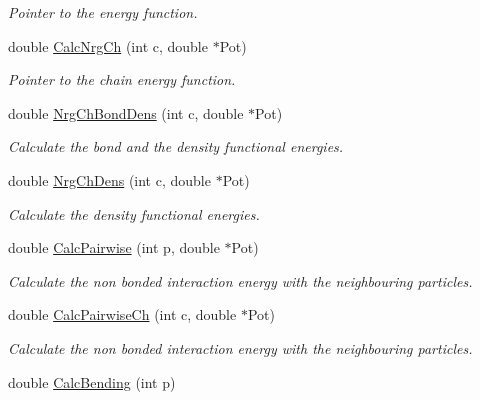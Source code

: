 \begin{DoxyCompactItemize}
\begin{DoxyCompactList}\small\item\em \-Pointer to the energy function. \end{DoxyCompactList}\item 
\hypertarget{classForces_ac028948e0862f18bf805f23078ebf7fa}{double \hyperlink{classForces_ac028948e0862f18bf805f23078ebf7fa}{\-Calc\-Nrg\-Ch} (int c, double $\ast$\-Pot)}\label{classForces_ac028948e0862f18bf805f23078ebf7fa}

\begin{DoxyCompactList}\small\item\em \-Pointer to the chain energy function. \end{DoxyCompactList}\item 
double \hyperlink{classForces_ab282af6b6987c94833eb3eb9bc5d28a4}{\-Nrg\-Ch\-Bond\-Dens} (int c, double $\ast$\-Pot)
\begin{DoxyCompactList}\small\item\em \-Calculate the bond and the density functional energies. \end{DoxyCompactList}\item 
\hypertarget{classForces_ab40568d4784987cff90e5081eee86a93}{double \hyperlink{classForces_ab40568d4784987cff90e5081eee86a93}{\-Nrg\-Ch\-Dens} (int c, double $\ast$\-Pot)}\label{classForces_ab40568d4784987cff90e5081eee86a93}

\begin{DoxyCompactList}\small\item\em \-Calculate the density functional energies. \end{DoxyCompactList}\item 
\hypertarget{classForces_abcf9fe5fd43b953a9f9c836bb23f4b26}{double \hyperlink{classForces_abcf9fe5fd43b953a9f9c836bb23f4b26}{\-Calc\-Pairwise} (int p, double $\ast$\-Pot)}\label{classForces_abcf9fe5fd43b953a9f9c836bb23f4b26}

\begin{DoxyCompactList}\small\item\em \-Calculate the non bonded interaction energy with the neighbouring particles. \end{DoxyCompactList}\item 
\hypertarget{classForces_ad5fa9268736b6a2b17b8b600fea178be}{double \hyperlink{classForces_ad5fa9268736b6a2b17b8b600fea178be}{\-Calc\-Pairwise\-Ch} (int c, double $\ast$\-Pot)}\label{classForces_ad5fa9268736b6a2b17b8b600fea178be}

\begin{DoxyCompactList}\small\item\em \-Calculate the non bonded interaction energy with the neighbouring particles. \end{DoxyCompactList}\item 
\hypertarget{classForces_a85c318f4f79eb537a5d0be2552fae2af}{double \hyperlink{classForces_a85c318f4f79eb537a5d0be2552fae2af}{\-Calc\-Bending} (int p)}\label{classForces_a85c318f4f79eb537a5d0be2552fae2af}


\end{DoxyCompactItemize}
